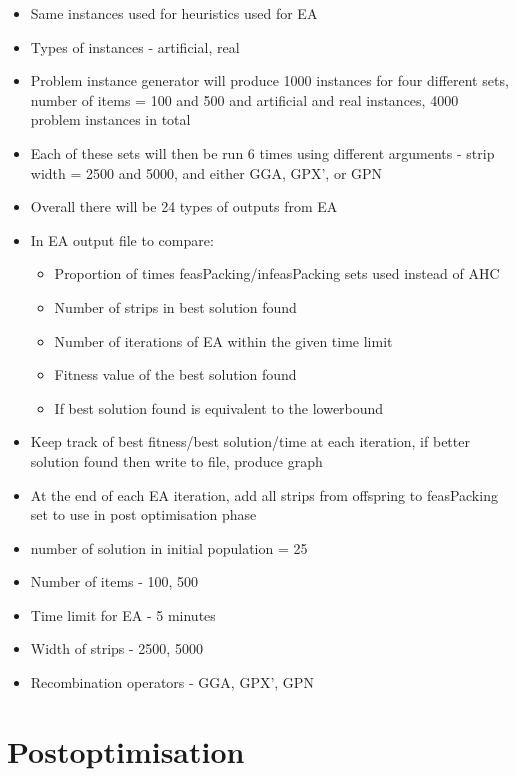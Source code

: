 \documentclass{elsarticle}
\begin{document}
{\color{OrangeRed}
\begin{itemize}[leftmargin=*]
	\item Same instances used for heuristics used for EA
	\item Types of instances - artificial, real
	\item Problem instance generator will produce 1000 instances for four different sets, number of items = 100 and 500 and artificial and real instances, 4000 problem instances in total
	\item Each of these sets will then be run 6 times using different arguments - strip width = 2500 and 5000, and either GGA, GPX', or GPN
	\item Overall there will be 24 types of outputs from EA
	\item In EA output file to compare:
	\begin{itemize}[leftmargin=*]
		\item Proportion of times feasPacking/infeasPacking sets used instead of AHC
		\item Number of strips in best solution found
		\item Number of iterations of EA within the given time limit
		\item Fitness value of the best solution found
		\item If best solution found is equivalent to the lowerbound
	\end{itemize}
	\item Keep track of best fitness/best solution/time at each iteration, if better solution found then write to file, produce graph
	\item At the end of each EA iteration, add all strips from offspring to feasPacking set to use in post optimisation phase
	\item number of solution in initial population = 25
	\item Number of items - 100, 500
	\item Time limit for EA - 5 minutes
	\item Width of strips - 2500, 5000
	\item Recombination operators - GGA, GPX', GPN
\end{itemize}
}


\section{Postoptimisation}
\label{sec:postopt}
\end{document}
